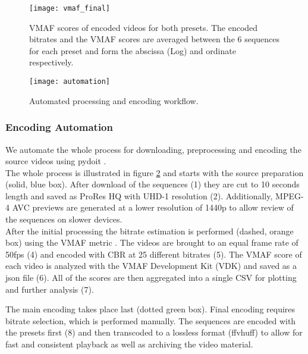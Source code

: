 \begin{figure}[!t]
	\centering
	\texttt{[image: vmaf\_final]}
	\caption{VMAF scores of encoded videos for both presets. The encoded bitrates and the VMAF scores are averaged between the 6 sequences for each preset and form the abscissa (Log) and ordinate respectively.}
	\label{fig:vmaf:encoded}
\end{figure}

\begin{figure}[!t]
	\centering
	\texttt{[image: automation]}
	\caption{Automated processing and encoding workflow.}
	\label{fig:automation}
\end{figure}

\subsubsection{Encoding Automation}
We automate the whole process for downloading, preprocessing and encoding the source videos using pydoit \cite{web:pydoit}.\\

The whole process is illustrated in figure \ref{fig:automation} and starts with the source preparation (solid, blue box). After download of the sequences (1) they are cut to 10 seconds length and saved as ProRes HQ with UHD-1 resolution (2). Additionally, MPEG-4 AVC previews are generated at a lower resolution of 1440p to allow review of the sequences on slower devices.\\

After the initial processing the bitrate estimation is performed (dashed, orange box) using the VMAF metric \cite{lin2014:fvqa}. The videos are brought to an equal frame rate of 50fps (4) and encoded with CBR at 25 different bitrates (5). The VMAF score of each video is analyzed with the VMAF Development Kit (VDK) \cite{web:vdk} and saved as a json file (6). All of the scores are then aggregated into a single CSV for plotting and further analysis (7).

The main encoding takes place last (dotted green box).
Final encoding requires bitrate selection, which is performed manually.
 The sequences are encoded with the presets first (8) and then transcoded to a lossless format (ffvhuff) to allow for fast and consistent playback as well as archiving the video material.


